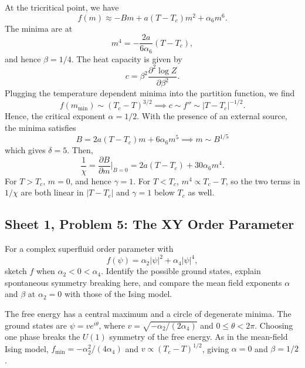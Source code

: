 \begin{solution}
    At the tricritical point, we have
    \begin{equation}
        f(m) \approx -Bm + a(T-T_c)m^2 + \alpha_6m^6.
    \end{equation}
    The minima are at
    \begin{equation}
        m^4 = - \frac{2a}{6\alpha_6}(T-T_c),
    \end{equation}
    and hence $\beta = 1/4$. The heat capacity is given by
    \begin{equation}
        c = \beta ^2 \frac{\partial^2 \log Z}{\partial \beta^2}.
    \end{equation}
    Plugging the temperature dependent minima into the partition function, we find
    \begin{equation}
        f(m_\mathrm{min}) \sim (T_c-T)^{3/2} \implies c \sim f'' \sim |T-T_c|^{-1/2}.
    \end{equation}
    Hence, the critical exponent $\alpha = 1/2$. With the presence of an external source, the minima satisfies
    \begin{equation}
        B = 2a(T-T_c)m + 6\alpha_6 m^5 \implies m \sim B^{1/5}
    \end{equation}
    which gives $\delta = 5$. Then,
    \begin{equation}
        \frac{1}{\chi} = \frac{\partial B}{\partial m}\bigg|_{B=0} =2a(T-T_c) + 30\alpha_6 m^4 .
    \end{equation}
    For $T > T_c$, $m =0$, and hence $\gamma = 1$. For $T< T_c$, $m^4\propto T_c-T$, so the two terms in $1/\chi$ are both linear in $|T-T_c|$ and $\gamma=1$ below $T_c$ as well.
\end{solution}

\subsection{Sheet 1, Problem 5: The XY Order Parameter}

For a complex superfluid order parameter with
\begin{equation}
    f(\psi)=\alpha_2|\psi|^2+\alpha_4|\psi|^4,
\end{equation}
sketch $f$ when $\alpha_2<0<\alpha_4$. Identify the possible ground
states, explain spontaneous symmetry breaking here, and compare the mean
field exponents $\alpha$ and $\beta$ at $\alpha_2=0$ with those of the
Ising model.
\begin{solution}
    The free energy has a central maximum and a circle of degenerate minima. The ground states are $\psi=ve^{i\theta}$, where $v=\sqrt{-\alpha_2/(2\alpha_4)}$ and $0\leq\theta<2\pi$. Choosing one phase breaks the $U(1)$ symmetry of the free energy. As in the mean-field Ising model, $f_{\min}=-\alpha_2^2/(4\alpha_4)$ and $v\propto(T_c-T)^{1/2}$, giving $\alpha=0$ and $\beta=1/2$.
\end{solution}

